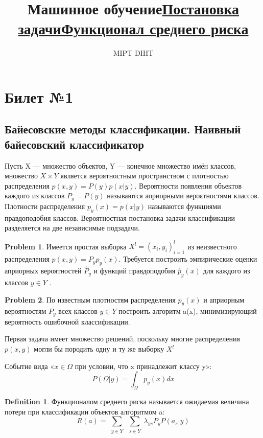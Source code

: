 \documentclass[a4paper]{article}
\title{Машинное обучение}
\author{MIPT DIHT}
\theoremstyle{plain}
\theoremstyle{remark}
\theoremstyle{definition}
\newtheorem{definition}{Definition}
\newtheorem{problem}{Problem}
\newcommand{\bigtitle}[1]{\title{\textbf{\underline{#1}}}}
\begin{document}
\maketitle

\section{Билет №1}
\subsection{Байесовские методы классификации. Наивный байесовский классификатор}
\bigtitle{Постановка задачи}
Пусть X — множество объектов, Y — конечное множество имён классов, множество $X \times Y$ является вероятностным пространством с плотностью распределения $p(x, y) = P(y)p(x|y)$. Вероятности появления объектов каждого из классов $P_y = P(y)$ называются априорными вероятностями классов. Плотности распределения $p_y(x) = p(x|y)$ называются функциями правдоподобия классов. Вероятностная постановка задачи классификации разделяется на две независимые подзадачи. 
\begin{problem}Имеется простая выборка $X^l = (x_i, y_i)_{i=1}^l$ из неизвестного распределения $p(x, y) = P_yp_y(x)$. Требуется построить эмпирические оценки априорных вероятностей $\hat{P}_y$ и функций правдоподобия $\hat{p}_y(x)$ для каждого из классов $y \in Y$ .
\end{problem}
\begin{problem} По известным плотностям распределения $p_y(x)$ и априорным вероятностям $P_y$ всех классов $y \in Y$ построить алгоритм a(x), минимизирующий вероятность ошибочной классификации.
\end{problem}
Первая задача имеет множество решений, поскольку многие распределения $p(x, y)$ могли бы породить одну и ту же выборку $X^l$

\bigtitle{Функционал среднего риска}
Событие вида «$x \in \Omega$ при условии, что x принадлежит классу y»:
$$ P(\Omega|y) = \int_{\Omega} p_y(x) dx $$
\begin{definition} Функционалом среднего риска называется ожидаемая величина потери
при классификации объектов алгоритмом a: $$ R(a) = \sum_{\substack{y \in Y}} \sum_{\substack{s \in Y}} \lambda_{ys} P_y P(a_s|y)$$\end{definition}
\end{document}
